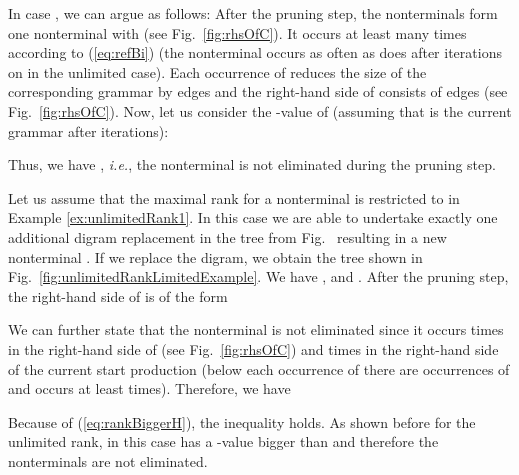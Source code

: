 \documentclass[12pt]{llncs}
\newcommand{\tp}{digram\xspace}
\newcommand{\hairsp}{\hspace{1pt}}\newcommand{\TODO}{\textcolor{red}{\bf TODO!}\xspace}
\newcommand{\ie}{\mbox{\textit{i.\hairsp{}e.}}\xspace}
\begin{document}
In case , we can argue as follows: After the pruning step, the nonterminals  form one nonterminal  with  (see Fig.~\ref{fig:rhsOfC}). It occurs at least  many times according to (\ref{eq:refBi}) (the nonterminal  occurs as often as  does after  iterations on  in the unlimited case). Each occurrence of  reduces the size of the corresponding grammar by  edges and the right-hand side of  consists of  edges (see Fig.~\ref{fig:rhsOfC}). Now, let us consider the -value of  (assuming that  is the current grammar after  iterations):

Thus, we have , \ie, the nonterminal  is not eliminated during the pruning step. 
\begin{example}\label{ex:unlimitedRank2}
	Let us assume that the maximal rank for a nonterminal is restricted to  in Example \ref{ex:unlimitedRank1}. In this case we are able to undertake exactly one additional \tp replacement in the tree from Fig.~ resulting in a new nonterminal . If we replace the \tp , we obtain the tree shown in Fig.~\ref{fig:unlimitedRankLimitedExample}. We have ,  and . After the pruning step, the right-hand side of  is of the form 
	
\end{example}
\bigskip
We can further state that the nonterminal  is not eliminated since it occurs  times in the right-hand side of  (see Fig.~\ref{fig:rhsOfC}) and  times in the right-hand side of the current start production (below each occurrence of  there are  occurrences of  and  occurs at least  times). Therefore, we have

Because of (\ref{eq:rankBiggerH}), the inequality  holds. As shown before for the unlimited rank, in this case  has a -value bigger than  and therefore the nonterminals  are not eliminated.
\end{document}
